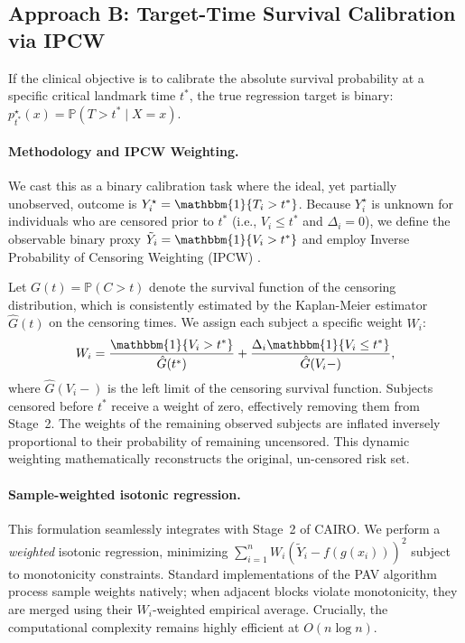 \documentclass[11pt]{article}
\theoremstyle{plain}
\theoremstyle{plain}
\theoremstyle{plain}
\theoremstyle{plain}
\theoremstyle{plain}
\theoremstyle{plain}
\theoremstyle{plain}
\begin{document}
\subsection{Approach B: Target-Time Survival Calibration via IPCW}

If the clinical objective is to calibrate the absolute survival probability at a specific critical landmark time $t^*$, the true regression target is binary: $p^{\star}_{t^*}(x) = \mathbb{P}(T > t^* \mid X=x)$. 

\paragraph{Methodology and IPCW Weighting.}
We cast this as a binary calibration task where the ideal, yet partially unobserved, outcome is $Y^\star_i = \mathbbm{1}\{T_i > t^*\}$. Because $Y^\star_i$ is unknown for individuals who are censored prior to $t^*$ (i.e., $V_i \le t^*$ and $\Delta_i = 0$), we define the observable binary proxy $\tilde{Y}_i = \mathbbm{1}\{V_i > t^*\}$ and employ Inverse Probability of Censoring Weighting (IPCW) \citep{graf1999assessment, gerds2006consistent}. 

Let $G(t) = \mathbb{P}(C > t)$ denote the survival function of the censoring distribution, which is consistently estimated by the Kaplan-Meier estimator $\hat{G}(t)$ on the censoring times. We assign each subject a specific weight $W_i$:
\begin{equation}
\label{eq:ipcw_weight}
    W_i = \frac{\mathbbm{1}\{V_i > t^*\}}{\hat{G}(t^*)} + \frac{\Delta_i \mathbbm{1}\{V_i \le t^*\}}{\hat{G}(V_i-)},
\end{equation}
where $\hat{G}(V_i-)$ is the left limit of the censoring survival function. Subjects censored before $t^*$ receive a weight of zero, effectively removing them from Stage~2. The weights of the remaining observed subjects are inflated inversely proportional to their probability of remaining uncensored. This dynamic weighting mathematically reconstructs the original, un-censored risk set.

\paragraph{Sample-weighted isotonic regression.}
This formulation seamlessly integrates with Stage~2 of \textsc{CAIRO}. We perform a \emph{weighted} isotonic regression, minimizing $\sum_{i=1}^n W_i (\tilde{Y}_i - f(g(x_i)))^2$ subject to monotonicity constraints. Standard implementations of the PAV algorithm process sample weights natively; when adjacent blocks violate monotonicity, they are merged using their $W_i$-weighted empirical average. Crucially, the computational complexity remains highly efficient at $O(n \log n)$.
\end{document}
